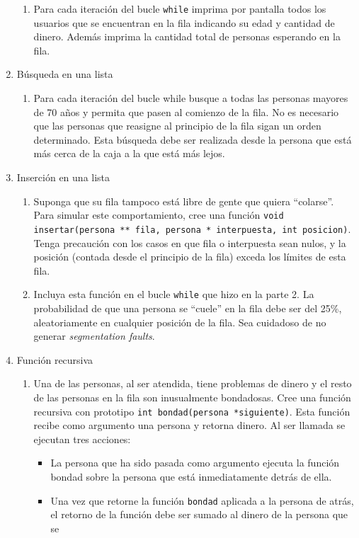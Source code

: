 \documentclass[a4paper,10pt]{article}
\begin{document}
\begin{enumerate}
\begin{enumerate}
    \item Para cada iteración del bucle \texttt{while} imprima por pantalla todos los usuarios que se encuentran en la fila indicando su edad y cantidad de dinero.
	  Además imprima la cantidad total de personas esperando en la fila.
  \end{enumerate}
  \item Búsqueda en una lista
  \begin{enumerate}
    \item Para cada iteración del bucle while busque a todas las personas mayores de 70 años y permita que pasen al comienzo de la fila. No es necesario que las personas
	  que reasigne al principio de la fila sigan un orden determinado. Esta búsqueda debe ser realizada desde la persona que está más cerca de la caja a la que
	  está más lejos.
  \end{enumerate}
  \item Inserción en una lista
  \begin{enumerate}
    \item Suponga que su fila tampoco está libre de gente que quiera “colarse”. Para simular este comportamiento, cree una función \texttt{void insertar(persona ** fila, persona * interpuesta, int posicion)}.
	  Tenga precaución con los casos en que fila o interpuesta sean nulos, y la posición (contada desde el principio de la fila) exceda los límites de esta fila.
    \item Incluya esta función en el bucle \texttt{while} que hizo en la parte 2. La probabilidad de que una persona se “cuele” en la fila debe ser del 25\%,
	  aleatoriamente en cualquier posición de la fila. Sea cuidadoso de no generar \textit{segmentation faults}.
  \end{enumerate}
  \item Función recursiva
  \begin{enumerate}
    \item Una de las personas, al ser atendida, tiene problemas de dinero y el resto de las personas en la fila son inusualmente bondadosas. Cree una función recursiva
	  con prototipo \texttt{int bondad(persona *siguiente)}. Esta función recibe como argumento una persona y retorna dinero. Al ser llamada se ejecutan tres
	  acciones:
    \begin{itemize}
      \item La persona que ha sido pasada como argumento ejecuta la función bondad sobre la persona que está inmediatamente detrás de ella.
      \item Una vez que retorne la función \texttt{bondad} aplicada a la persona de atrás, el retorno de la función debe ser sumado al dinero de la persona que se

\end{itemize}
\end{enumerate}
\end{enumerate}
\end{document}
